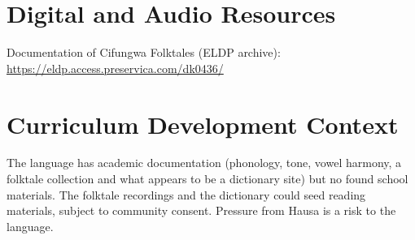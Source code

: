 \documentclass[12pt]{article}
\begin{document}
\section{Digital and Audio Resources}
Documentation of Cifungwa Folktales (ELDP archive): \url{https://eldp.access.preservica.com/dk0436/}

\section{Curriculum Development Context}
The language has academic documentation (phonology, tone, vowel harmony, a folktale collection and what appears to be a dictionary site) but no found school materials. The folktale recordings and the dictionary could seed reading materials, subject to community consent. Pressure from Hausa is a risk to the language.
\end{document}
